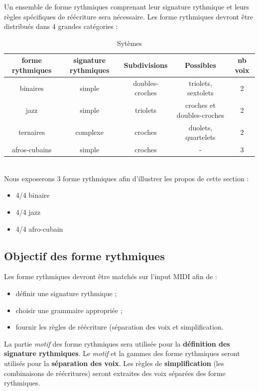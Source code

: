 Un ensemble de forme rythmiques comprenant leur signature rythmique et leurs règles spécifiques de réécriture sera nécessaire. 
Les forme rythmiques devront être distribués dans 4 grandes catégories :
\begin{table}[h]
	\centering
	\begin{tabular}{|c|c|c|c|c|} \hline
		forme rythmiques & signature rythmiques & Subdivisions & Possibles & nb voix \\ \hline
		binaires & simple & doubles-croches & triolets, sextolets & 2 \\
		jazz & simple & triolets & croches et doubles-croches & 2 \\
		ternaires & complexe & croches & duolets, quartelets & 2 \\
		afros-cubains & simple & croches & - & 3 \\ \hline
	\end{tabular}
	\caption{Sytèmes}
\end{table}\\
Nous exposerons 3 forme rythmiques afin d’illustrer les propos de cette section :
\begin{itemize}
	\item 4/4 binaire 
	\item 4/4 jazz
	\item 4/4 afro-cubain
\end{itemize}
\subsection*{Objectif des forme rythmiques}
Les forme rythmiques devront être matchés sur l’input MIDI afin de :
\begin{itemize}
	\item définir une signature rythmique ;
	\item choisir une grammaire appropriée ;
	\item fournir les règles de réécriture (séparation des voix et simplification.\\
\end{itemize}

La partie \textit{motif} des forme rythmiques sera utilisée pour la \textbf{définition des signature rythmiques}. 
Le \textit{motif} et la gammes des forme rythmiques seront utilisés pour la \textbf{séparation des voix}. 
Les règles de \textbf{simplification} (les combinaisons de réécritures) seront extraites des voix séparées des forme rythmiques.

